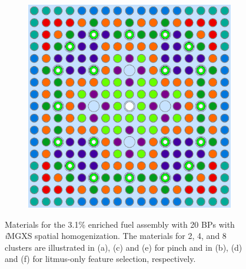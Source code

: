 \begin{figure}[h!]
\begin{subfigure}{0.47\textwidth}
  \caption{}
  \label{fig:chap10-assm-31-20BPs-pinch-8}
\end{subfigure}%
\begin{subfigure}{0.47\textwidth}
  \centering
  \includegraphics[width=0.9\linewidth]{figures/unsupervised/geometries/with-features/8-clusters/combined/assm-31-20BPs}
  \caption{}
  \label{fig:chap10-assm-31-20BPs-combined-8}
\end{subfigure}
\caption[Clustered geometries for a 3.1\% enriched assembly]{Materials for the 3.1\% enriched fuel assembly with 20 \acp{BP} with \textit{i}\ac{MGXS} spatial homogenization. The materials for 2, 4, and 8 clusters are illustrated in (a), (c) and (e) for pinch and in (b), (d) and (f) for litmus-only feature selection, respectively.}
\label{fig:chap10-assm-31-20BPs-geometries}
\end{figure}

\clearpage

